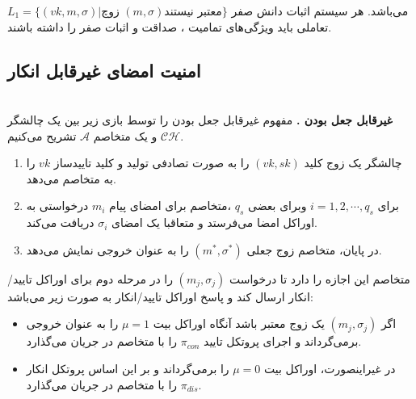\documentclass[12pt,a4paper]{article}
\theoremstyle{plain}
\theoremstyle{definition}
\theoremstyle{remark}
\begin{document}
$L_1 = \{ (vk,m,\sigma) | 
\text{زوچ 
	$(m,\sigma)$
	معتبر نیستند
}
\}$
می‌باشد. هر سیستم اثبات دانش صفر تعاملی باید ویژگی‌های تمامیت ، صداقت و اثبات صفر را داشته باشند.


\subsection{امنیت امضای غیرقابل انکار}
\\
\textbf{غیرقابل جعل بودن .}
مفهوم غیرقابل جعل بودن را توسط بازی زیر بین یک چالشگر 
$\mathcal{CH}$
 و یک متخاصم
$\mathcal{A}$
تشریح می‌کنیم.
\begin{enumerate}
	
	\item 
	چالشگر یک زوج کلید
	$(vk,sk)$
	را به صورت تصادفی تولید و کلید تاییدساز 
	$vk$
	را به متخاصم می‌دهد.
	\item 
	برای 
	$i = 1,2,\cdots, q_s$
	وبرای بعضی
	$q_s$
	،متخاصم برای امضای پیام 
	$m_i$
	درخواستی به اوراکل امضا می‌فرستد و متعاقبا یک امضای
	$\sigma_i$
	دریافت می‌کند.
	\item 
	در پایان، متخاصم زوج جعلی 
	$(m^*,{\sigma}^*)$
	را به عنوان خروجی نمایش می‌دهد.
\end{enumerate}
متخاصم این اجازه را دارد تا درخواست
$(m_j,\sigma_j)$
را در مرحله دوم برای اوراکل تایید/انکار ارسال کند و پاسخ اوراکل تایید/انکار به صورت زیر می‌باشد:
\begin{itemize}
	\item 
	اگر 
	$(m_j,\sigma_j)$
	یک زوج معتبر باشد آنگاه اوراکل بیت
	$\mu = 1$
	را به عنوان خروجی برمی‌گرداند و اجرای پروتکل تایید
	$\pi_{con}$ 
	را با متخاصم در جریان می‌گذارد.
	
	\item 
	در غیر‌اینصورت، اوراکل بیت
	$\mu = 0$
	را برمی‌گرداند و بر این اساس پروتکل انکار 
	$\pi_{dis}$
	را با متخاصم در جریان می‌گذارد.
\end{itemize}
\end{document}
